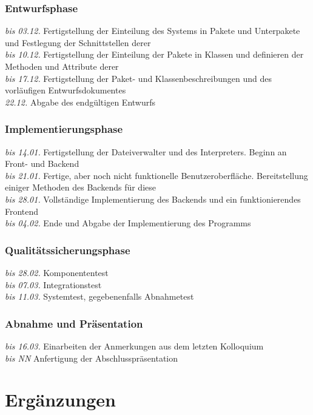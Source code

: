 \documentclass[parskip=full]{scrartcl}
\begin{document}
\subsubsection{Entwurfsphase}
\textit{bis 03.12.} Fertigstellung der Einteilung des Systems in Pakete und Unterpakete und Festlegung der Schnittstellen derer \\
\textit{bis 10.12.} Fertigstellung der Einteilung der Pakete in Klassen und definieren der Methoden und Attribute derer \\
\textit{bis 17.12.} Fertigstellung der Paket- und Klassenbeschreibungen und des vorläufigen Entwurfsdokumentes\\
\textit{22.12.} Abgabe des endgültigen Entwurfs

\subsubsection{Implementierungsphase}
\textit{bis 14.01.} Fertigstellung der Dateiverwalter und des Interpreters. Beginn an Front- und Backend\\
\textit{bis 21.01.} Fertige, aber noch nicht funktionelle Benutzeroberfläche. Bereitstellung einiger Methoden des Backends für diese\\
\textit{bis 28.01.} Vollständige Implementierung des Backends und ein funktionierendes Frontend\\
\textit{bis 04.02.} Ende und Abgabe der Implementierung des Programms

\subsubsection{Qualitätssicherungsphase}
\textit{bis 28.02.} Komponententest\\
\textit{bis 07.03.} Integrationstest\\
\textit{bis 11.03.} Systemtest, gegebenenfalls Abnahmetest\\

\subsubsection{Abnahme und Präsentation }
\textit{bis 16.03.} Einarbeiten der Anmerkungen aus dem letzten Kolloquium \\
\textit{bis NN} Anfertigung der Abschlusspräsentation
\newpage
\section{Ergänzungen}
\end{document}
